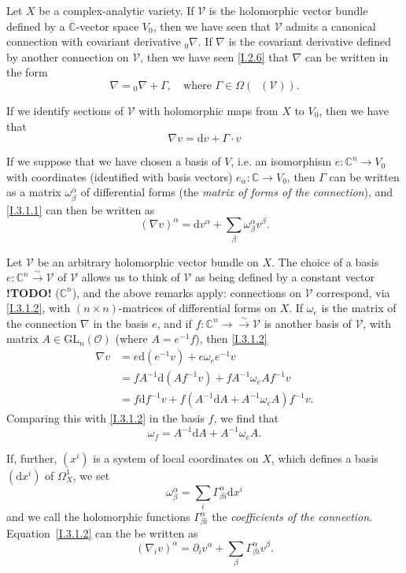 \documentclass{report}
\theoremstyle{plain}
\theoremstyle{definition}
\newenvironment{env}[1]
    {\renewcommand\theinnercustomenv{#1}\innercustomenv}
    {\endinnercustomenv}
\newcommand{\sh}[1]{{\mathscr{#1}}}
\newcommand{\CC}{\mathbb{C}}
\newcommand{\dd}{\mathrm{d}}
\newcommand{\GL}{\mathrm{GL}}
\DeclareMathOperator{\shEnd}{\underline{End}}
\newcommand{\todo}{\textbf{ !TODO! }}
\newcommand{\oldpage}[1]{\marginpar{\footnotesize$\Big\vert$ \textit{p.~#1}}}
\begin{document}
\begin{env}{3.1}
\label{I.3.1}
  Let $X$ be a complex-analytic variety.
  If $\sh{V}$ is the holomorphic vector bundle defined by a $\CC$-vector space $V_0$, then we have seen that $\sh{V}$ admits a canonical connection with covariant derivative ${}_0\!\nabla$.
  If $\nabla$ is the covariant derivative defined by another connection on $\sh{V}$, then we have seen \cref{I.2.6} that $\nabla$ can be written in the form
  \[
    \nabla = {}_0\!\nabla + \Gamma,
    \quad\mbox{where $\Gamma\in\Omega(\shEnd(\sh{V}))$.}
  \]

  If we identify sections of $\sh{V}$ with holomorphic maps from $X$ to $V_0$, then we have that
  \[
  \label{I.3.1.1}
    \nabla v = \dd v + \Gamma\cdot v
  \tag{3.1.1}
  \]

  If we suppose that we have chosen a basis of $V$, i.e. an isomorphism $e\colon\CC^n\to V_0$ with coordinates (identified with basis vectors) $e_\alpha\colon\CC\to V_0$, then $\Gamma$ can be written as a matrix $\omega_\beta^\alpha$ of differential forms (the \emph{matrix of forms of the connection}), and \cref{I.3.1.1} can then be written as
  \[
  \label{I.3.1.2}
    (\nabla v)^\alpha = \dd v^\alpha + \sum_\beta \omega_\beta^\alpha v^\beta.
  \tag{3.1.2}
  \]

  Let $\sh{V}$ be an arbitrary holomorphic vector bundle on $X$.
  The choice of a basis $e\colon\CC^n\xrightarrow{\sim}\sh{V}$ of $\sh{V}$ allows us to think of $\sh{V}$ as being defined by a
\oldpage{22}
  constant vector \todo ($\CC^n$), and the above remarks apply:
  connections on $\sh{V}$ correspond, via \cref{I.3.1.2}, with $(n\times n)$-matrices of differential forms on $X$.
  If $\omega_e$ is the matrix of the connection $\nabla$ in the basis $e$, and if $f\colon\CC^n\to\xrightarrow{\sim}\sh{V}$ is another basis of $\sh{V}$, with matrix $A\in\GL_n(\sh{O})$ (where $A=e^{-1}f$), then \cref{I.3.1.2}
  \[
    \begin{aligned}
      \nabla v
      &= e\dd(e^{-1}v) + e\omega_e e^{-1}v
    \\&= fA^{-1}\dd(Af^{-1}v) + fA^{-1}\omega_e Af^{-1}v
    \\&= f\dd f^{-1}v + f(A^{-1}\dd A + A^{-1}\omega_e A)f^{-1}v.
    \end{aligned}
  \]
  Comparing this with \cref{I.3.1.2} in the basis $f$, we find that
  \[
  \label{I.3.1.3}
    \omega_f = A^{-1}\dd A + A^{-1}\omega_e A.
  \tag{3.1.3}
  \]

  If, further, $(x^i)$ is a system of local coordinates on $X$, which defines a basis $(\dd x^i)$ of $\Omega_X^1$, we set
  \[
    \omega_\beta^\alpha = \sum_i \Gamma_{\beta i}^\alpha \dd x^i
  \]
  and we call the holomorphic functions $\Gamma_{\beta i}^\alpha$ the \emph{coefficients of the connection}.
  Equation~\cref{I.3.1.2} can the be written as
  \[
  \label{I.3.1.4}
    (\nabla_i v)^\alpha = \partial_i v^\alpha + \sum_\beta \Gamma_{\beta i}^\alpha v^\beta.
  \tag{3.1.4}
  \]


\end{env}
\end{document}
